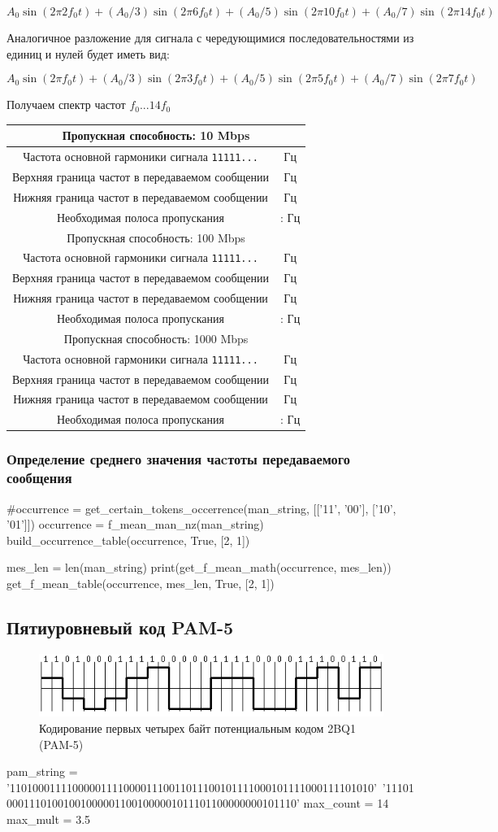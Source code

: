 \documentclass[12pt, a4paper]{article}
\newcommand{\bandwidthEntry}[2]{
  \hline
  \multicolumn{2}{|c|}{Пропускная способность: #1 Mbps} \\
  \hline
  Частота основной гармоники сигнала \texttt{11111...} & \py{int(f_0[#1] * #2)} Гц \\
  Верхняя граница частот в передаваемом сообщении & \py{int(max_mult * f_0[#1])} Гц \\
  Нижняя граница частот в передаваемом сообщении & \py{int(f_0[#1] / max_count)} Гц \\
  Необходимая полоса пропускания & \py{int(f_0[#1] / max_count)} : \py{int(max_mult * f_0[#1])} Гц \\
}
\begin{document}
$$A_0 \sin(2 \pi 2 f_0 t) + (A_0 / 3) \sin(2 \pi 6 f_0 t) +
  (A_0 / 5) \sin(2 \pi 10 f_0 t) + (A_0 / 7) \sin(2 \pi 14 f_0 t)$$

Аналогичное разложение для сигнала с чередующимися последовательностями из
единиц и нулей будет иметь вид:

$$A_0 \sin(2 \pi f_0 t) + (A_0 / 3) \sin(2 \pi 3 f_0 t) +
  (A_0 / 5) \sin(2 \pi 5 f_0 t) + (A_0 / 7) \sin(2 \pi 7 f_0 t)$$

Получаем спектр частот $f_0 ... 14 f_0$

\begin{tabular}{| c | c |}
  \bandwidthEntry{10}{2}
  \bandwidthEntry{100}{2}
  \bandwidthEntry{1000}{2}
  \hline
\end{tabular}

\subsubsection*{Определение среднего значения чаcтоты передаваемого сообщения}


\begin{pycode}
#occurrence = get_certain_tokens_occerrence(man_string, [['11', '00'], ['10', '01']])
occurrence = f_mean_man_nz(man_string)
build_occurrence_table(occurrence, True, [2, 1])

mes_len = len(man_string)
print(get_f_mean_math(occurrence, mes_len))
get_f_mean_table(occurrence, mes_len, True, [2, 1])
\end{pycode}

\subsection{Пятиуровневый код PAM-5}

\begin{figure}[h]
  \begin{center}
    \includegraphics{pam}
    \caption{Кодирование первых четырех байт потенциальным кодом 2BQ1 (PAM-5)}
  \end{center}
\end{figure}

\begin{pycode}
pam_string = '1101000111100000111100001110011011100101111000101111000111101010'\
  '11101000111010010010000011001000001011101100000000101110'
max_count = 14
max_mult = 3.5
\end{pycode}
\end{document}
